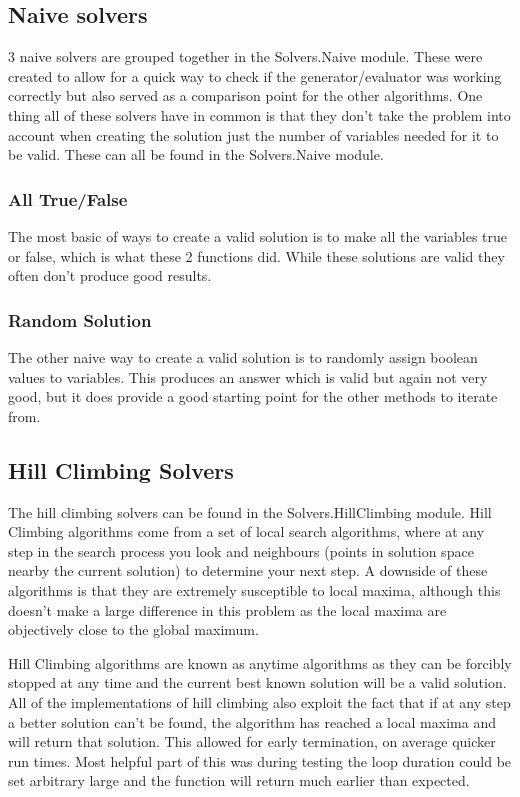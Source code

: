\documentclass[a4paper]{article}
\begin{document}
\subsection{Naive solvers}
3 naive solvers are grouped together in the Solvers.Naive module.
These were created to allow for a quick way to check if the generator/evaluator was working correctly but also served as a comparison point for the other algorithms.
One thing all of these solvers have in common is that they don't take the problem into account when creating the solution just the number of variables needed for it to be valid.
These can all be found in the Solvers.Naive module.
\subsubsection{All True/False}
The most basic of ways to create a valid solution is to make all the variables true or false, which is what these 2 functions did.
While these solutions are valid they often don't produce good results.


\subsubsection{Random Solution}
The other naive way to create a valid solution is to randomly assign boolean values to variables.
This produces an answer which is valid but again not very good, but it does provide a good starting point for the other methods to iterate from.


\subsection{Hill Climbing Solvers}
The hill climbing solvers can be found in the Solvers.HillClimbing module.
Hill Climbing algorithms come from a set of local search algorithms, where at any step in the search process you look and neighbours (points in solution space nearby the current solution) to determine your next step.
A downside of these algorithms is that they are extremely susceptible to local maxima, although this doesn't make a large difference in this problem as the local maxima are objectively close to the global maximum.
\par
Hill Climbing algorithms are known as anytime algorithms as they can be forcibly stopped at any time and the current best known solution will be a valid solution.
All of the implementations of hill climbing also exploit the fact that if at any step a better solution can't be found, the algorithm has reached a local maxima and will return that solution.
This allowed for early termination, on average quicker run times.
Most helpful part of this was during testing the loop duration could be set arbitrary large and the function will return much earlier than expected.
\end{document}
